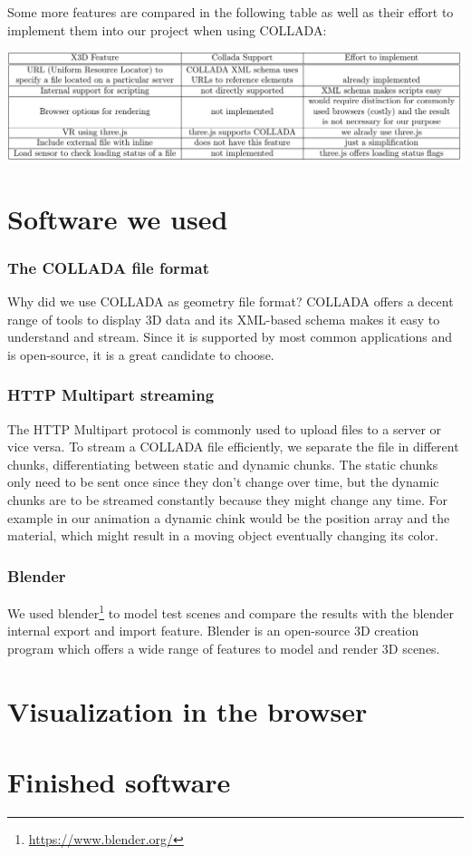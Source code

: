\documentclass[%
aip,
jmp,
amsmath,amssymb,
reprint,
nofootinbib
]{revtex4-1}
\begin{document}
	Some more features are compared in the following table as well as their effort to implement them into our project when using COLLADA:
	
	\includegraphics[width=\linewidth]{images/Comparison}
	
	\section{Software we used}
	\subsubsection{The COLLADA file format}
	
	Why did we use COLLADA as geometry file format? COLLADA offers a decent range of tools to display 3D data and its XML-based schema makes it easy to understand and stream. Since it is supported by most common applications and is open-source, it is a great candidate to choose. 
	
	\subsubsection{HTTP Multipart streaming}
	The HTTP Multipart protocol is commonly used to upload files to a server or vice versa. To stream a COLLADA file efficiently, we separate the file in different chunks, differentiating between static and dynamic chunks. The static chunks only need to be sent once since they don't change over time, but the dynamic chunks are to be streamed constantly because they might change any time. For example in our animation a dynamic chink would be the position array and the material, which might result in a moving object eventually changing its color.
	
	\subsubsection{Blender}
	We used blender\footnote{\url{https://www.blender.org/}} to model test scenes and compare the results with the blender internal export and import feature. Blender is an open-source 3D creation program which offers a wide range of features to model and render 3D scenes. 
	
	\section{Visualization in the browser}
	
	\section{Finished software}
	
	
\end{document}
